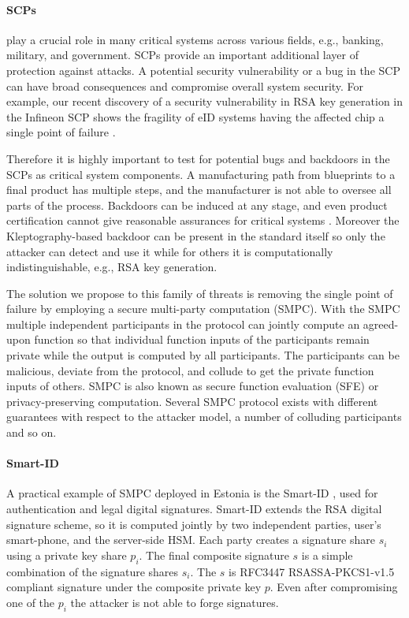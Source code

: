 \documentclass[
  digital, %
  twoside, %
  table,   %
  lof,     %
  lot,     %
]{fithesis3}
\newcounter{ph4_show_guides}
\theoremstyle{definition}
\theoremstyle{remark}
\begin{document}
\begin{ecmmnt}
    \paragraph{SCPs} play a crucial role in many critical systems across various fields, e.g., banking, military, and government.
    SCPs provide an important additional layer of protection against attacks. A potential security vulnerability or a bug in the SCP can have broad consequences and compromise overall system security. For example, our recent discovery of a security vulnerability in RSA key generation in the Infineon SCP shows the fragility of eID systems having the affected chip a single point of failure \cite{2017-ccs-nemec}. 
    
    Therefore it is highly important to test for potential
    bugs and backdoors in the SCPs as critical system components. A manufacturing path from blueprints to a final product has multiple steps, and the manufacturer is not able to oversee all parts of the process. Backdoors can be induced at any stage, and even product certification cannot give reasonable assurances for critical systems \cite{2017-ccs-nemec}. Moreover the Kleptography-based \cite{Young:1997:KUC:1754542.1754551} backdoor can be present in the standard itself so only the attacker can detect and use it while for others it is computationally indistinguishable, e.g., RSA key generation. 
    
    The solution we propose to this family of threats is removing the single point of failure by employing a secure multi-party computation (SMPC). 
    With the SMPC multiple independent participants in the protocol can jointly compute an agreed-upon function so that individual function inputs of the participants remain private while the output is computed by all participants. The participants can be malicious, deviate from the protocol, and collude to get the private function inputs of others. SMPC is also known as secure function evaluation (SFE) or privacy-preserving computation. Several SMPC protocol exists with different guarantees with respect to the attacker model, a number of colluding participants and so on.
    
    \paragraph{Smart-ID} A practical example of SMPC deployed in Estonia is the Smart-ID \cite{smart_id_ee}, used for authentication and legal digital signatures. Smart-ID extends the RSA digital signature scheme, so it is computed jointly by two independent parties, user's smart-phone, and the server-side HSM. 
    Each party creates a signature share $s_i$ using a private key share $p_i$. The final composite signature $s$ is a simple combination of the signature shares $s_i$. 
    The $s$ is RFC3447 \cite{rfc3447} RSASSA-PKCS1-v1.5 compliant signature under the composite private key $p$. Even after compromising one of the $p_i$ the attacker is not able to forge signatures.



\end{ecmmnt}
\end{document}
